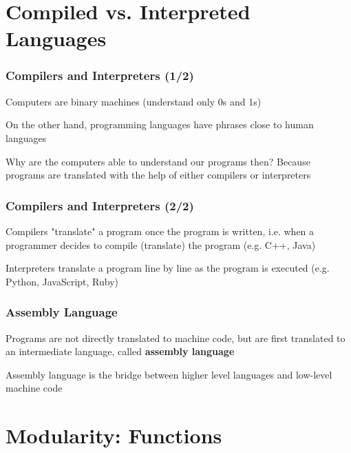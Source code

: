 \documentclass{beamer}
\begin{document}
\section{Compiled vs. Interpreted Languages}

\begin{frame}
\frametitle{Compilers and Interpreters (1/2)}
    Computers are binary machines (understand only 0s and 1s)
    \newline

    On the other hand, programming languages have phrases close to human languages
    \newline

    Why are the computers able to understand our programs then? Because programs are translated with the help of either compilers or interpreters
\end{frame}

\begin{frame}
\frametitle{Compilers and Interpreters (2/2)}
    Compilers "translate" a program once the program is written, i.e. when a programmer decides to compile (translate) the program (e.g. C++, Java)
    \newline

    Interpreters translate a program line by line as the program is executed (e.g. Python, JavaScript, Ruby)
\end{frame}

\begin{frame}
\frametitle{Assembly Language}
    Programs are not directly translated to machine code, but are first translated to an intermediate language, called \textbf{assembly language}
    \newline

    Assembly language is the bridge between higher level languages and low-level machine code
\end{frame}

\section{Modularity: Functions}
\end{document}
